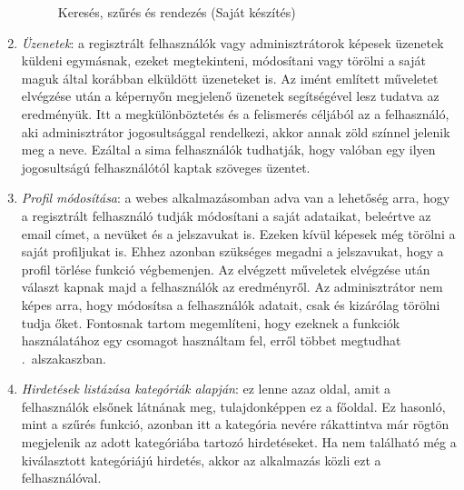 \documentclass[]{thesis-ekf}
\theoremstyle{definition}
\theoremstyle{remark}
\begin{document}
\begin{enumerate}
\begin{figure}[ht!]
					\caption{Keresés, szűrés és rendezés (Saját készítés)} 
					\label{kereses-szures-muvelet}
				\end{figure}
			\item \emph{Üzenetek}: a regisztrált felhasználók vagy adminisztrátorok képesek üzenetek küldeni egymásnak, ezeket megtekinteni, módosítani vagy törölni a saját maguk által korábban elküldött üzeneteket is. Az imént említett műveletet elvégzése után a képernyőn megjelenő üzenetek segítségével lesz tudatva az eredményük. Itt a megkülönböztetés és a felismerés céljából az a felhasználó, aki adminisztrátor jogosultsággal rendelkezi, akkor annak zöld színnel jelenik meg a neve. Ezáltal a sima felhasználók tudhatják, hogy valóban egy ilyen jogosultságú felhasználótól kaptak szöveges üzentet.
			\item \emph{Profil módosítása}: a webes alkalmazásomban adva van a lehetőség arra, hogy a regisztrált felhasználó tudják módosítani a saját adataikat, beleértve az email címet, a nevüket és a jelszavukat is. Ezeken kívül képesek még törölni a saját profiljukat is. Ehhez azonban szükséges megadni a jelszavukat, hogy a profil törlése funkció végbemenjen. Az elvégzett műveletek elvégzése után választ kapnak majd a felhasználók az eredményről. Az adminisztrátor nem képes arra, hogy módosítsa a felhasználók adatait, csak és kizárólag törölni tudja őket. Fontosnak tartom megemlíteni, hogy ezeknek a funkciók használatához egy csomagot használtam fel, erről többet megtudhat .~alszakaszban.
			\item \emph{Hirdetések listázása kategóriák alapján}: ez lenne azaz oldal, amit a felhasználók elsőnek látnának meg, tulajdonképpen ez a főoldal. Ez hasonló, mint a szűrés funkció, azonban itt a kategória nevére rákattintva már rögtön megjelenik az adott kategóriába tartozó hirdetéseket. Ha nem található még a kiválasztott kategóriájú hirdetés, akkor az alkalmazás közli ezt a felhasználóval.
		\end{enumerate}
		
\end{document}
